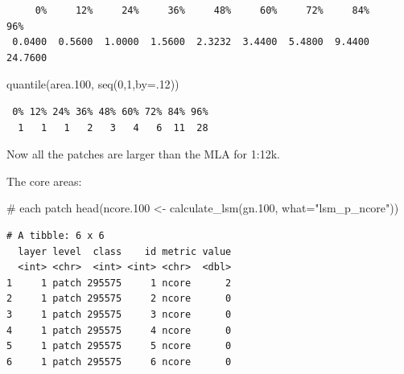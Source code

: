 \documentclass[
  letterpaper,
  DIV=11,
  numbers=noendperiod]{scrartcl}
\newenvironment{Shaded}{\begin{snugshade}}{\end{snugshade}}
\newcommand{\AttributeTok}[1]{\textcolor[rgb]{0.40,0.45,0.13}{#1}}
\newcommand{\CommentTok}[1]{\textcolor[rgb]{0.37,0.37,0.37}{#1}}
\newcommand{\ConstantTok}[1]{\textcolor[rgb]{0.56,0.35,0.01}{#1}}
\newcommand{\DecValTok}[1]{\textcolor[rgb]{0.68,0.00,0.00}{#1}}
\newcommand{\FloatTok}[1]{\textcolor[rgb]{0.68,0.00,0.00}{#1}}
\newcommand{\FunctionTok}[1]{\textcolor[rgb]{0.28,0.35,0.67}{#1}}
\newcommand{\NormalTok}[1]{\textcolor[rgb]{0.00,0.23,0.31}{#1}}
\newcommand{\OtherTok}[1]{\textcolor[rgb]{0.00,0.23,0.31}{#1}}
\newcommand{\SpecialCharTok}[1]{\textcolor[rgb]{0.37,0.37,0.37}{#1}}
\newcommand{\StringTok}[1]{\textcolor[rgb]{0.13,0.47,0.30}{#1}}
\begin{document}
\begin{verbatim}
     0%     12%     24%     36%     48%     60%     72%     84%     96% 
 0.0400  0.5600  1.0000  1.5600  2.3232  3.4400  5.4800  9.4400 24.7600 
\end{verbatim}

\begin{Shaded}
\begin{Highlighting}[]
\FunctionTok{quantile}\NormalTok{(area}\FloatTok{.100}\NormalTok{, }\FunctionTok{seq}\NormalTok{(}\DecValTok{0}\NormalTok{,}\DecValTok{1}\NormalTok{,}\AttributeTok{by=}\NormalTok{.}\DecValTok{12}\NormalTok{))}
\end{Highlighting}
\end{Shaded}

\begin{verbatim}
 0% 12% 24% 36% 48% 60% 72% 84% 96% 
  1   1   1   2   3   4   6  11  28 
\end{verbatim}

Now all the patches are larger than the MLA for 1:12k.

The core areas:

\begin{Shaded}
\begin{Highlighting}[]
\CommentTok{\# each patch}
\FunctionTok{head}\NormalTok{(ncore}\FloatTok{.100} \OtherTok{\textless{}{-}} \FunctionTok{calculate\_lsm}\NormalTok{(gn}\FloatTok{.100}\NormalTok{, }\AttributeTok{what=}\StringTok{"lsm\_p\_ncore"}\NormalTok{))}
\end{Highlighting}
\end{Shaded}

\begin{verbatim}
# A tibble: 6 x 6
  layer level  class    id metric value
  <int> <chr>  <int> <int> <chr>  <dbl>
1     1 patch 295575     1 ncore      2
2     1 patch 295575     2 ncore      0
3     1 patch 295575     3 ncore      0
4     1 patch 295575     4 ncore      0
5     1 patch 295575     5 ncore      0
6     1 patch 295575     6 ncore      0
\end{verbatim}

\begin{Shaded}
\end{Shaded}
\end{document}
